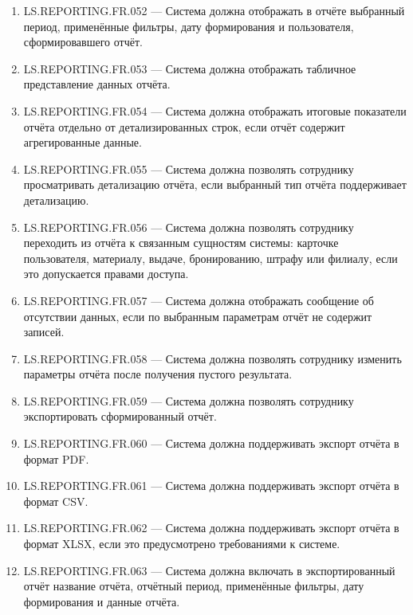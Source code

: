 \documentclass[12pt,a4paper]{article}
\begin{document}
\begin{enumerate}
		\item LS.REPORTING.FR.052 --- Система должна отображать в отчёте выбранный
		период, применённые фильтры, дату формирования и пользователя, сформировавшего
		отчёт.
		
		\item LS.REPORTING.FR.053 --- Система должна отображать табличное представление
		данных отчёта.
		
		\item LS.REPORTING.FR.054 --- Система должна отображать итоговые показатели отчёта
		отдельно от детализированных строк, если отчёт содержит агрегированные данные.
		
		\item LS.REPORTING.FR.055 --- Система должна позволять сотруднику просматривать
		детализацию отчёта, если выбранный тип отчёта поддерживает детализацию.
		
		\item LS.REPORTING.FR.056 --- Система должна позволять сотруднику переходить
		из отчёта к связанным сущностям системы: карточке пользователя, материалу,
		выдаче, бронированию, штрафу или филиалу, если это допускается правами доступа.
		
		\item LS.REPORTING.FR.057 --- Система должна отображать сообщение об отсутствии
		данных, если по выбранным параметрам отчёт не содержит записей.
		
		\item LS.REPORTING.FR.058 --- Система должна позволять сотруднику изменить
		параметры отчёта после получения пустого результата.
		
		\item LS.REPORTING.FR.059 --- Система должна позволять сотруднику экспортировать
		сформированный отчёт.
		
		\item LS.REPORTING.FR.060 --- Система должна поддерживать экспорт отчёта в формат
		PDF.
		
		\item LS.REPORTING.FR.061 --- Система должна поддерживать экспорт отчёта в формат
		CSV.
		
		\item LS.REPORTING.FR.062 --- Система должна поддерживать экспорт отчёта в формат
		XLSX, если это предусмотрено требованиями к системе.
		
		\item LS.REPORTING.FR.063 --- Система должна включать в экспортированный отчёт
		название отчёта, отчётный период, применённые фильтры, дату формирования
		и данные отчёта.
		

\end{enumerate}
\end{document}
